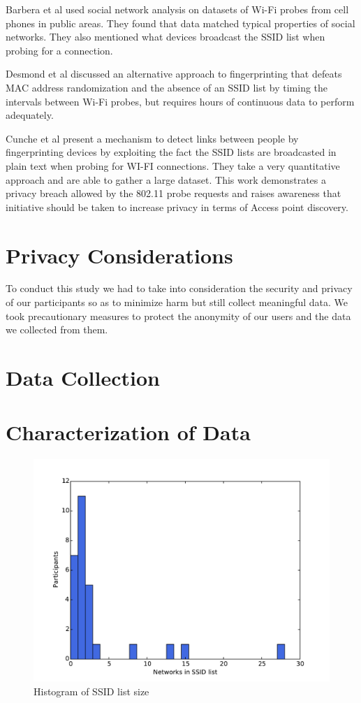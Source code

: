 \documentclass[letterpaper,twocolumn,10pt]{article}
\begin{document}
Barbera et al  used social network analysis on datasets of Wi-Fi probes from cell phones in public areas. They found that data matched typical properties of social networks. They also mentioned what devices broadcast the SSID list when probing for a connection.

Desmond et al discussed an alternative approach to fingerprinting that defeats MAC address 
randomization and the absence of an SSID list by timing the intervals between Wi-Fi probes, but requires hours of continuous data to perform adequately.

Cunche et al  present a mechanism to detect links between people by fingerprinting devices by exploiting the fact the SSID lists are broadcasted in plain text when probing for WI-FI connections. They take a very quantitative approach and are able to gather a large dataset. This work demonstrates a privacy breach allowed by the 802.11 probe requests and raises awareness that initiative should be taken to increase privacy in terms of Access point discovery. 





\section{Privacy Considerations}
To conduct this study we had to take into consideration the security and privacy of our participants so as to minimize harm but still collect meaningful data. We took precautionary measures to protect the anonymity of our users and the data we collected from them.



\section{Data Collection}


\section{Characterization of Data}

\begin{figure}
\includegraphics[width=\columnwidth]{hist.pdf}
\caption{Histogram of SSID list size}
\end{figure}
\end{document}
